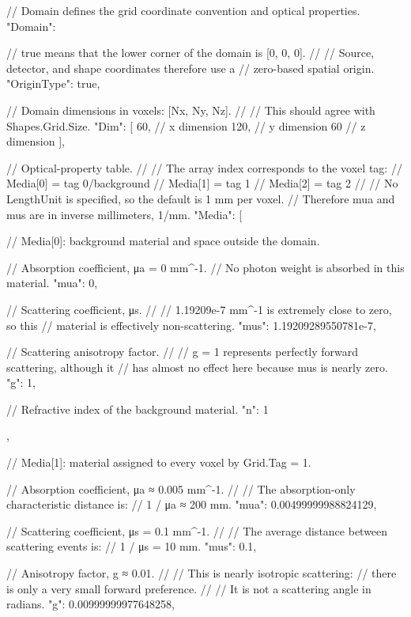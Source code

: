 {  // Domain defines the grid coordinate convention and optical properties.
  "Domain": {

    // true means that the lower corner of the domain is [0, 0, 0].
    //
    // Source, detector, and shape coordinates therefore use a
    // zero-based spatial origin.
    "OriginType": true,

    // Domain dimensions in voxels: [Nx, Ny, Nz].
    //
    // This should agree with Shapes.Grid.Size.
    "Dim": [
      60,  // x dimension
      120, // y dimension
      60   // z dimension
    ],

    // Optical-property table.
    //
    // The array index corresponds to the voxel tag:
    //   Media[0] = tag 0/background
    //   Media[1] = tag 1
    //   Media[2] = tag 2
    //
    // No LengthUnit is specified, so the default is 1 mm per voxel.
    // Therefore mua and mus are in inverse millimeters, 1/mm.
    "Media": [

      // Media[0]: background material and space outside the domain.
      {
        // Absorption coefficient, μa = 0 mm^-1.
        // No photon weight is absorbed in this material.
        "mua": 0,

        // Scattering coefficient, μs.
        //
        // 1.19209e-7 mm^-1 is extremely close to zero, so this
        // material is effectively non-scattering.
        "mus": 1.19209289550781e-7,

        // Scattering anisotropy factor.
        //
        // g = 1 represents perfectly forward scattering, although it
        // has almost no effect here because mus is nearly zero.
        "g": 1,

        // Refractive index of the background material.
        "n": 1
      },

      // Media[1]: material assigned to every voxel by Grid.Tag = 1.
      {
        // Absorption coefficient, μa ≈ 0.005 mm^-1.
        //
        // The absorption-only characteristic distance is:
        // 1 / μa ≈ 200 mm.
        "mua": 0.00499999988824129,

        // Scattering coefficient, μs = 0.1 mm^-1.
        //
        // The average distance between scattering events is:
        // 1 / μs = 10 mm.
        "mus": 0.1,

        // Anisotropy factor, g ≈ 0.01.
        //
        // This is nearly isotropic scattering:
        // there is only a very small forward preference.
        //
        // It is not a scattering angle in radians.
        "g": 0.00999999977648258,

}}}
